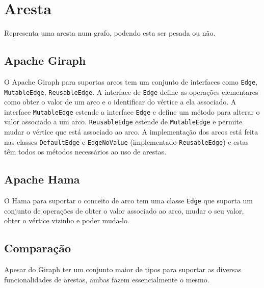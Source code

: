 \newpage
\section{Aresta}
Representa uma aresta num grafo, podendo esta ser pesada ou não.
\subsection*{Apache Giraph}
O Apache Giraph para suportas arcos tem um conjunto de interfaces como \texttt{Edge}, \texttt{MutableEdge}, \texttt{ReusableEdge}. A interface de \texttt{Edge} define as operações
elementares como obter o valor de um arco e o identificar do vértice a ela associado. A interface \texttt{MutableEdge} estende a interface \texttt{Edge} e define
um método para alterar o valor associado a um arco. \texttt{ReusableEdge} estende de \texttt{MutableEdge} e permite mudar o vértice que está associado ao arco.
A implementação dos arcos está feita nas classes \texttt{DefaultEdge} e \texttt{EdgeNoValue} (implementado \texttt{ReusableEdge}) e estas têm todos os métodos necessários ao uso de arestas.

\subsection*{Apache Hama}
O Hama para suportar o conceito de arco tem uma classe \texttt{Edge} que suporta um conjunto de operações de obter o valor associado ao arco, mudar o seu valor,
obter o vértice vizinho e poder muda-lo. 

\subsection*{Comparação}
Apesar do Giraph ter um conjunto maior de tipos para suportar as diversas funcionalidades de arestas, ambas fazem essencialmente
o mesmo.